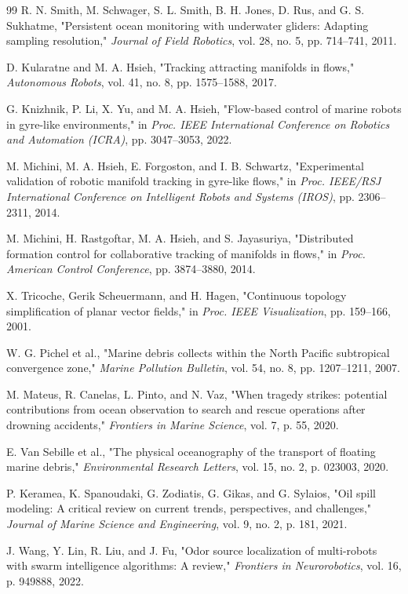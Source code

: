 \documentclass[lettersize,journal]{IEEEtran}
\begin{document}
\begin{thebibliography}{99}
 R. N. Smith, M. Schwager, S. L. Smith, B. H. Jones, D. Rus, and G. S. Sukhatme, "Persistent ocean monitoring with underwater gliders: Adapting sampling resolution," \textit{Journal of Field Robotics}, vol. 28, no. 5, pp. 714--741, 2011.

 D. Kularatne and M. A. Hsieh, "Tracking attracting manifolds in flows," \textit{Autonomous Robots}, vol. 41, no. 8, pp. 1575--1588, 2017.

 G. Knizhnik, P. Li, X. Yu, and M. A. Hsieh, "Flow-based control of marine robots in gyre-like environments," in \textit{Proc. IEEE International Conference on Robotics and Automation (ICRA)}, pp. 3047--3053, 2022.

 M. Michini, M. A. Hsieh, E. Forgoston, and I. B. Schwartz, "Experimental validation of robotic manifold tracking in gyre-like flows," in \textit{Proc. IEEE/RSJ International Conference on Intelligent Robots and Systems (IROS)}, pp. 2306--2311, 2014.

 M. Michini, H. Rastgoftar, M. A. Hsieh, and S. Jayasuriya, "Distributed formation control for collaborative tracking of manifolds in flows," in \textit{Proc. American Control Conference}, pp. 3874--3880, 2014.

 X. Tricoche, Gerik Scheuermann, and H. Hagen, "Continuous topology simplification of planar vector fields," in \textit{Proc. IEEE Visualization}, pp. 159--166, 2001.

 W. G. Pichel et al., "Marine debris collects within the North Pacific subtropical convergence zone," \textit{Marine Pollution Bulletin}, vol. 54, no. 8, pp. 1207--1211, 2007.

 M. Mateus, R. Canelas, L. Pinto, and N. Vaz, "When tragedy strikes: potential contributions from ocean observation to search and rescue operations after drowning accidents," \textit{Frontiers in Marine Science}, vol. 7, p. 55, 2020.

 E. Van Sebille et al., "The physical oceanography of the transport of floating marine debris," \textit{Environmental Research Letters}, vol. 15, no. 2, p. 023003, 2020.

 P. Keramea, K. Spanoudaki, G. Zodiatis, G. Gikas, and G. Sylaios, "Oil spill modeling: A critical review on current trends, perspectives, and challenges," \textit{Journal of Marine Science and Engineering}, vol. 9, no. 2, p. 181, 2021.

 J. Wang, Y. Lin, R. Liu, and J. Fu, "Odor source localization of multi-robots with swarm intelligence algorithms: A review," \textit{Frontiers in Neurorobotics}, vol. 16, p. 949888, 2022.


\end{thebibliography}
\end{document}
